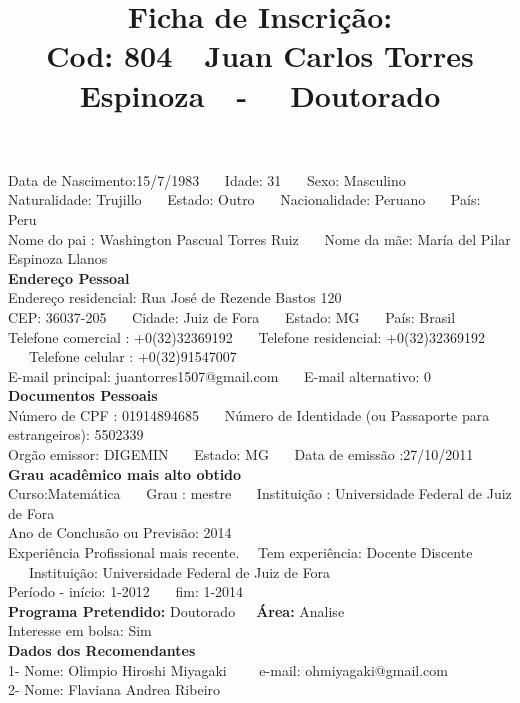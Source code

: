 \documentclass[11pt]{article}
\title{\vspace*{-4cm} Ficha de Inscrição: \\Cod: 804\ \ Juan Carlos Torres Espinoza\ \ - \ \ Doutorado 
 }
\date{}
\begin{document}
\maketitle
\vspace*{-1.5cm}
\noindent Data de Nascimento:15/7/1983
\ \ \ Idade: 31   \ \ \ Sexo: Masculino
\\
Naturalidade: Trujillo  
\ \ \  Estado: Outro
\ \ \  Nacionalidade: Peruano
\ \ \ País: Peru
\\        
Nome do pai : Washington Pascual Torres Ruiz
\ \ \ Nome da mãe: María del Pilar Espinoza Llanos          
\\[0.2cm]                     
\textbf{Endereço Pessoal} 
\\ 
\noindent Endereço residencial: Rua José de Rezende Bastos 120
\\
        CEP: 36037-205 
\ \ \ Cidade: Juiz de Fora 
\ \ \ Estado: MG 
\ \ \ País: Brasil
\\		
		Telefone comercial : +0(32)32369192
\ \ \ Telefone residencial: +0(32)32369192
\ \ \ Telefone celular : +0(32)91547007
\\
E-mail principal: juantorres1507@gmail.com
\ \ \ E-mail alternativo: 0 
\\[0.2cm] 
\textbf{Documentos Pessoais}
\\
\noindent Número de CPF : 01914894685
\ \ \ Número de Identidade (ou Passaporte para estrangeiros): 5502339
\\
Orgão emissor: DIGEMIN
\ \ \ Estado: MG
\ \ \ Data de emissão :27/10/2011
\\[0.3cm]
\textbf{Grau acadêmico mais alto obtido}
\\	
Curso:Matemática
\ \ \ Grau : mestre
\ \ \ Instituição : Universidade Federal de Juiz de Fora
\\			
Ano de Conclusão ou Previsão: 2014
\\ 
Experiência Profissional mais recente. \ \  
Tem experiência: Docente Discente  
\ \ \ Instituição: Universidade Federal de Juiz de Fora
\\  
Período - início: 1-2012
\ \ \ fim: 1-2014
\\[0.2cm] 
\textbf{Programa Pretendido:} Doutorado\ \ \ \textbf{Área:} Analise\\
Interesse em bolsa: Sim
\\[0.3cm]		
\textbf{Dados dos Recomendantes} 
\\
1- Nome: Olimpio Hiroshi Miyagaki
\ \ \ \  e-mail: ohmiyagaki@gmail.com 
\\
2- Nome: Flaviana Andrea Ribeiro
\end{document}

